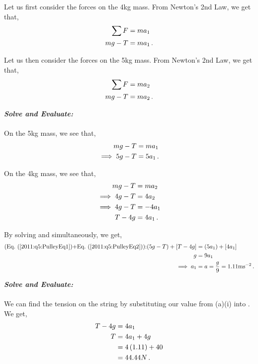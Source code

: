 \begin{subquestions}
\begin{subsubquestions}
	Let us first consider the forces on the 4kg mass. From Newton's 2nd Law, we get that,
	\begin{align}
		\sum F & = ma_1 \nonumber \\
		mg - T & = ma_1 \,.
	\end{align}
	
	Let us then consider the forces on the 5kg mass. From Newton's 2nd Law, we get that,
	\begin{align}
		\sum F & = ma_2 \nonumber \\
		mg-T & = ma_2 \,.
	\end{align}
	
	
	
	
	\textbf{\textit{Solve and Evaluate:}} \\ \\
	On the 5kg mass, we see that,
	\begin{align}
		mg - T & = ma_1 \nonumber \\
		\implies 5g-T & = 5a_1 \,. \label{2011:q5:PulleyEq1}
	\end{align}
	
	On the 4kg mass, we see that,
	\begin{align}
		mg - T & = ma_2 \nonumber \\
		\implies 4g-T & = 4a_2 \nonumber \\
		\implies 4g-T & = -4a_1 \nonumber \\
		T-4g & = 4a_1 \,. \label{2011:q5:PulleyEq2}
	\end{align}
	
	By solving  and  simultaneously, we get,
	\begin{align}
		\text{(\req{2011:q5:PulleyEq1}+\req{2011:q5:PulleyEq2}):} (5g-T)+[T-4g] & = (5a_1)+[4a_1] \nn \\
		g & = 9a_1 \nn \\
		\implies a_1 & = a = \frac{g}{9} = 1.11\text{ms}^{-2} \,.
	\end{align}
	
	
	\subsubquestion
	
	\textbf{\textit{Solve and Evaluate:}} \\ \\
	We can find the tension on the string by substituting our value from (a)(i) into . We get,
	\begin{align}
		T-4g & = 4a_1 \nonumber \\
		T & = 4a_1 + 4g \nonumber \\
		& = 4\left(1.11 \right) + 40 \nonumber \\
		& = 44.44N \,.
	\end{align}

\end{subsubquestions}

\end{subquestions}
